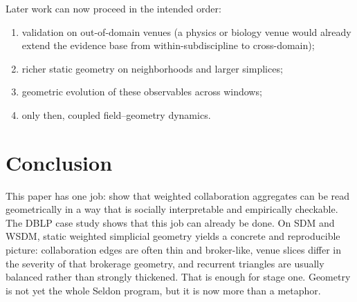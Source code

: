 \documentclass[11pt]{article}
\begin{document}
Later work can now proceed in the intended order:
\begin{enumerate}[label=(\arabic*)]
    \item validation on out-of-domain venues (a physics or biology venue would already extend the evidence base from within-subdiscipline to cross-domain);
    \item richer static geometry on neighborhoods and larger simplices;
    \item geometric evolution of these observables across windows;
    \item only then, coupled field--geometry dynamics.
\end{enumerate}

\section{Conclusion}

This paper has one job: show that weighted collaboration aggregates can be read geometrically in a way that is socially interpretable and empirically checkable. The DBLP case study shows that this job can already be done. On SDM and WSDM, static weighted simplicial geometry yields a concrete and reproducible picture: collaboration edges are often thin and broker-like, venue slices differ in the severity of that brokerage geometry, and recurrent triangles are usually balanced rather than strongly thickened. That is enough for stage one. Geometry is not yet the whole Seldon program, but it is now more than a metaphor.
\end{document}
